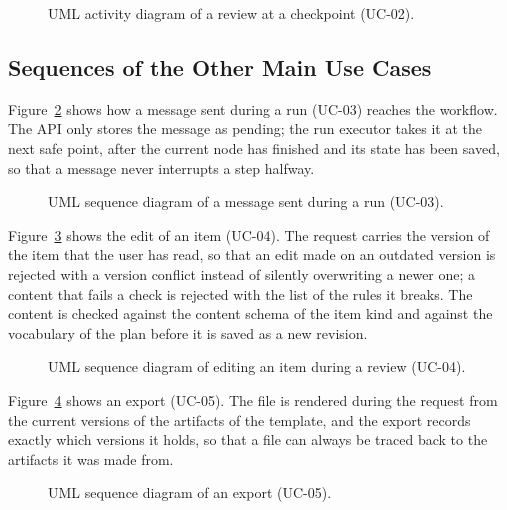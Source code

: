 \begin{figure}[H]
    \centering
    \resizebox{0.95\linewidth}{!}{}
    \caption{UML activity diagram of a review at a checkpoint (UC-02).}
    \label{fig:sd-review}
\end{figure}

\subsection{Sequences of the Other Main Use Cases}
\label{sec:sd-sequences-other}

Figure~\ref{fig:sd-seq-message} shows how a message sent during a run (UC-03) reaches the workflow. The API only stores the message as pending; the run executor takes it at the next safe point, after the current node has finished and its state has been saved, so that a message never interrupts a step halfway.

\begin{figure}[H]
    \centering
    \resizebox{\linewidth}{!}{}
    \caption{UML sequence diagram of a message sent during a run (UC-03).}
    \label{fig:sd-seq-message}
\end{figure}

Figure~\ref{fig:sd-seq-edit} shows the edit of an item (UC-04). The request carries the version of the item that the user has read, so that an edit made on an outdated version is rejected with a version conflict instead of silently overwriting a newer one; a content that fails a check is rejected with the list of the rules it breaks. The content is checked against the content schema of the item kind and against the vocabulary of the plan before it is saved as a new revision.

\begin{figure}[H]
    \centering
    \resizebox{\linewidth}{!}{}
    \caption{UML sequence diagram of editing an item during a review (UC-04).}
    \label{fig:sd-seq-edit}
\end{figure}

Figure~\ref{fig:sd-seq-export} shows an export (UC-05). The file is rendered during the request from the current versions of the artifacts of the template, and the export records exactly which versions it holds, so that a file can always be traced back to the artifacts it was made from.

\begin{figure}[H]
    \centering
    \resizebox{\linewidth}{!}{}
    \caption{UML sequence diagram of an export (UC-05).}
    \label{fig:sd-seq-export}
\end{figure}

